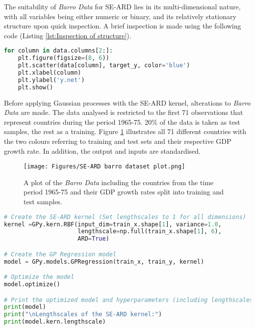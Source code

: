 \documentclass[12pt,a4paper]{article}
\begin{document}
The suitability of \textit{Barro Data} for SE-ARD lies in its multi-dimensional nature, with all variables being either numeric or binary, and its relatively stationary structure upon quick inspection. A brief inspection is made using the following code (Listing \ref{lst:Inspection of structure}).

\vspace{20pt}
\begin{lstlisting}[language=python, caption={Code of creating plots to inspect on the structure of the data.}, label={lst:Inspection of structure}]
for column in data.columns[2:]:
    plt.figure(figsize=(8, 6))
    plt.scatter(data[column], target_y, color='blue')
    plt.xlabel(column)
    plt.ylabel('y.net')
    plt.show()
\end{lstlisting}

Before applying Gaussian processes with the SE-ARD kernel, alterations to \textit{Barro Data} are made. The data analysed is restricted to the first 71 observations that represent countries during the period 1965-75.  20\% of the data is taken as test samples, the rest as a training. Figure \ref{fig:SE-ARD barro dataset plot} illustrates all 71 different countries with the two colours referring to training and test sets and their respective GDP growth rate. In addition, the output and inputs are standardised.

\begin{figure}
\centering
\texttt{[image: Figures/SE-ARD barro dataset plot.png]} 
\caption{A plot of the \textit{Barro Data} including the countries from the time period 1965-75 and their GDP growth rates split into training and test samples.} \label{fig:SE-ARD barro dataset plot}
\end{figure}

\vspace{10pt}
\begin{lstlisting}[language=python, caption={Code of running the GP regression with an SE-ARD kernel.}, label={lst:SE-ARD}]
# Create the SE-ARD kernel (Set lengthscales to 1 for all dimensions)
kernel =GPy.kern.RBF(input_dim=train_x.shape[1], variance=1.0,
                     lengthscale=np.full(train_x.shape[1], 6),
                     ARD=True)

# Create the GP Regression model
model = GPy.models.GPRegression(train_x, train_y, kernel)

# Optimize the model
model.optimize()

# Print the optimized model and hyperparameters (including lengthscales)
print(model)
print("\nLengthscales of the SE-ARD kernel:")
print(model.kern.lengthscale)
\end{lstlisting}
\end{document}
